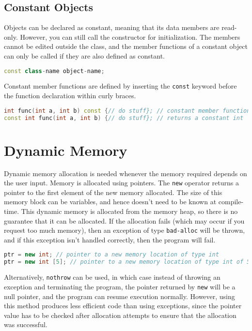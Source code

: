 \documentclass[10pt]{article}
\begin{document}
\subsection{Constant Objects}

Objects can be declared as constant, meaning that its data members are read-only. However, you can still call the constructor for initialization. The members cannot be edited outside the class, and the member functions of a constant object can only be called if they are also defined as constant. 

\begin{lstlisting}[language=C++]
const class-name object-name;
\end{lstlisting}

Constant member functions are defined by inserting the \texttt{const} keyword before the function declaration within curly braces.

\begin{lstlisting}[language=C++]
int func(int a, int b) const {// do stuff}; // constant member function
const int func(int a, int b) {// do stuff}; // returns a constant int
\end{lstlisting}

\section{Dynamic Memory}

Dynamic memory allocation is needed whenever the memory required depends on the user input. Memory is allocated using pointers. The \texttt{new} operator returns a pointer to the first element of the new memory allocated. The size of this memory block can be variables, and hence doesn't need to be known at compile-time. This dynamic memory is allocated from the memory heap, so there is no guarantee that it can be allocated. If the allocation fails (which may occur if you request too much memory), then an exception of type \texttt{bad-alloc} will be thrown, and if this exception isn't handled correctly, then the program will fail. 

\begin{lstlisting}[language=C++]
ptr = new int; // pointer to a new memory location of type int
ptr = new int [5]; // pointer to a new memory location of type int of 5 values
\end{lstlisting}

Alternatively, \texttt{nothrow} can be used, in which case instead of throwing an exception and terminating the program, the pointer returned by \texttt{new} will be a null pointer, and the program can resume execution normally. However, using this method produces less efficient code than using exceptions, since the pointer value has to be checked after allocation attempts to ensure that the allocation was successful. 
\end{document}
